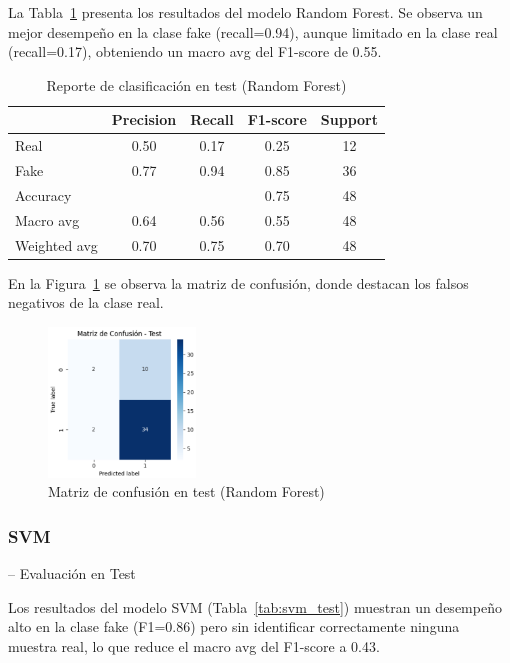 \documentclass[conference]{IEEEtran}
\begin{document}
La Tabla~\ref{tab:rf_test} presenta los resultados del modelo Random Forest. Se observa un mejor desempeño en la clase fake (recall=0.94), aunque limitado en la clase real (recall=0.17), obteniendo un macro avg del F1-score de 0.55.

\begin{table}[htbp]
\centering
\caption{Reporte de clasificación en test (Random Forest)}
\begin{tabular}{lcccc}
\toprule
 & Precision & Recall & F1-score & Support \\
\midrule
Real & 0.50 & 0.17 & 0.25 & 12 \\
Fake & 0.77 & 0.94 & 0.85 & 36 \\
\midrule
Accuracy & & & 0.75 & 48 \\
Macro avg & 0.64 & 0.56 & 0.55 & 48 \\
Weighted avg & 0.70 & 0.75 & 0.70 & 48 \\
\bottomrule
\end{tabular}
\label{tab:rf_test}
\end{table}

\vspace{0.2cm}
En la Figura~\ref{fig:cm_rf} se observa la matriz de confusión, donde destacan los falsos negativos de la clase real.
\begin{figure}[htbp]
\centering
\includegraphics[width=0.35\textwidth]{images/cm_rf.png}
\caption{Matriz de confusión en test (Random Forest)}
\label{fig:cm_rf}
\end{figure}

\vspace{2cm}

\subsubsection{SVM }-- Evaluación en Test

Los resultados del modelo SVM (Tabla~\ref{tab:svm_test}) muestran un desempeño alto en la clase fake (F1=0.86) pero sin identificar correctamente ninguna muestra real, lo que reduce el macro avg del F1-score a 0.43.
\end{document}
